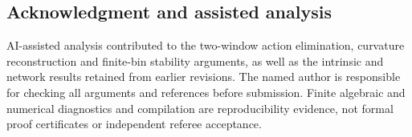 \documentclass[11pt]{amsart}
\theoremstyle{definition}\newtheorem{definition}[theorem]{Definition}
\theoremstyle{remark}\newtheorem{remark}[theorem]{Remark}
\numberwithin{equation}{section}
\begin{document}
\subsection*{Acknowledgment and assisted analysis}
AI-assisted analysis contributed to the two-window action elimination,
curvature reconstruction and finite-bin stability arguments, as well as
the intrinsic and network results retained from earlier revisions. The
named author is responsible for checking all arguments and references
before submission. Finite algebraic and numerical diagnostics and
compilation are reproducibility evidence, not formal proof certificates
or independent referee acceptance.

\end{document}
